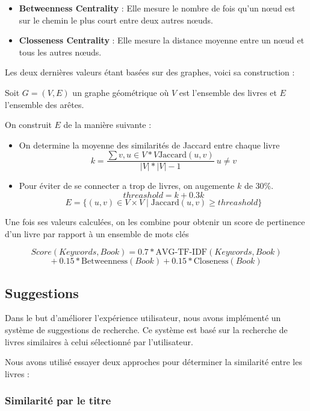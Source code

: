 \documentclass[
  12pt,
]{article}
\providecommand{\tightlist}{%
  \setlength{\itemsep}{0pt}\setlength{\parskip}{0pt}}
\begin{document}
\begin{itemize}
\item
  \textbf{Betweenness Centrality} : Elle mesure le nombre de fois qu'un
  nœud est sur le chemin le plus court entre deux autres nœuds.
\item
  \textbf{Closseness Centrality} : Elle mesure la distance moyenne entre
  un nœud et tous les autres nœuds.
\end{itemize}

Les deux dernières valeurs étant basées sur des graphes, voici sa
construction :

Soit \(G = (V, E)\) un graphe géométrique où \(V\) est l'ensemble des
livres et \(E\) l'ensemble des arêtes.

On construit \(E\) de la manière suivante :

\begin{itemize}
\tightlist
\item
  On determine la moyenne des similarités de Jaccard entre chaque livre
  \[ k = \frac{\sum{v,u \in V*V} \text{Jaccard}(u, v)}{|V|*|V|-1}\ u \neq v\]
\item
  Pour éviter de se connecter a trop de livres, on augemente \(k\) de
  30\%. \[ threashold = k + 0.3k\]
  \[ E = \{(u, v) \in V \times V \mid \text{Jaccard}(u, v) \geq threashold\}\]
\end{itemize}

Une fois ses valeurs calculées, on les combine pour obtenir un score de
pertinence d'un livre par rapport à un ensemble de mots clés

\[Score(Keywords, Book) = 0.7*\text{AVG-TF-IDF}(Keywords, Book)\]
\[ +\ 0.15*\text{Betweenness}(Book) + 0.15*\text{Closeness}(Book)\]

\newpage

\subsection{Suggestions}\label{suggestions}

Dans le but d'améliorer l'expérience utilisateur, nous avons implémenté
un système de suggestions de recherche. Ce système est basé sur la
recherche de livres similaires à celui sélectionné par l'utilisateur.

Nous avons utilisé essayer deux approches pour déterminer la similarité
entre les livres :

\subsubsection{Similarité par le
titre}\label{similarituxe9-par-le-titre}
\end{document}
